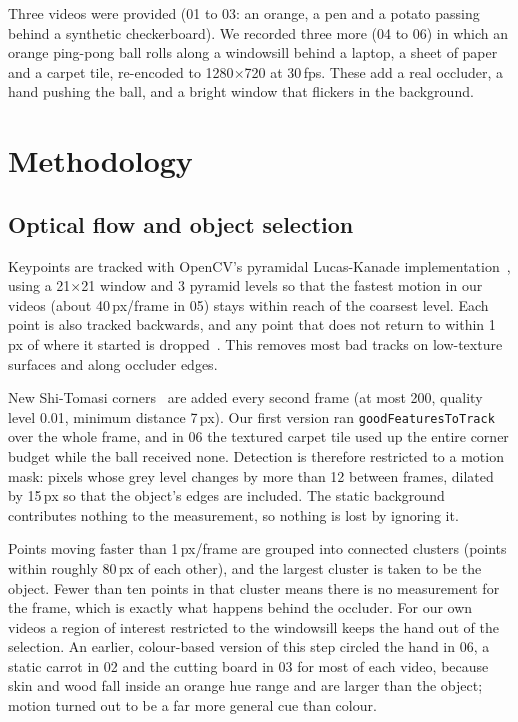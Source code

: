 \documentclass[conference]{assets/latex/IEEEtran}
\begin{document}
Three videos were provided (01 to 03: an orange, a pen and a potato passing behind a synthetic checkerboard). We recorded three more (04 to 06) in which an orange ping-pong ball rolls along a windowsill behind a laptop, a sheet of paper and a carpet tile, re-encoded to 1280$\times$720 at 30\,fps. These add a real occluder, a hand pushing the ball, and a bright window that flickers in the background.

\section{Methodology}

\subsection{Optical flow and object selection}

Keypoints are tracked with OpenCV's pyramidal Lucas-Kanade implementation~\cite{lucas1981,bouguet2000}, using a 21$\times$21 window and 3 pyramid levels so that the fastest motion in our videos (about 40\,px/frame in 05) stays within reach of the coarsest level. Each point is also tracked backwards, and any point that does not return to within 1\,px of where it started is dropped~\cite{kalal2010}. This removes most bad tracks on low-texture surfaces and along occluder edges.

New Shi-Tomasi corners~\cite{shi1994} are added every second frame (at most 200, quality level 0.01, minimum distance 7\,px). Our first version ran \texttt{goodFeaturesToTrack} over the whole frame, and in 06 the textured carpet tile used up the entire corner budget while the ball received none. Detection is therefore restricted to a motion mask: pixels whose grey level changes by more than 12 between frames, dilated by 15\,px so that the object's edges are included. The static background contributes nothing to the measurement, so nothing is lost by ignoring it.

Points moving faster than 1\,px/frame are grouped into connected clusters (points within roughly 80\,px of each other), and the largest cluster is taken to be the object. Fewer than ten points in that cluster means there is no measurement for the frame, which is exactly what happens behind the occluder. For our own videos a region of interest restricted to the windowsill keeps the hand out of the selection. An earlier, colour-based version of this step circled the hand in 06, a static carrot in 02 and the cutting board in 03 for most of each video, because skin and wood fall inside an orange hue range and are larger than the object; motion turned out to be a far more general cue than colour.
\end{document}
